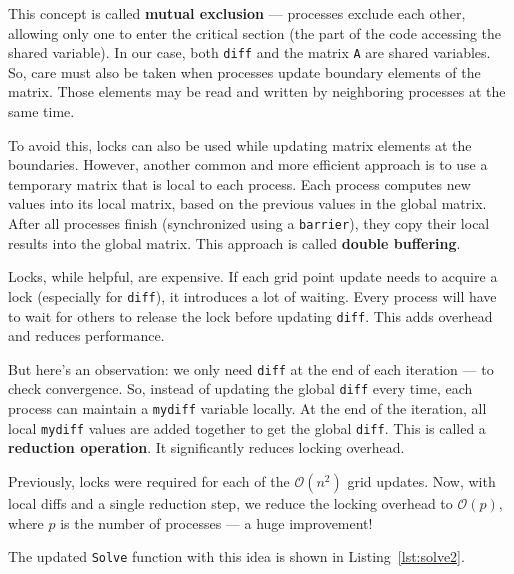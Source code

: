 \documentclass[12pt]{book}
\begin{document}
This concept is called \textbf{mutual exclusion} — processes exclude each other, allowing only one to enter the critical section (the part of the code accessing the shared variable). In our case, both \texttt{diff} and the matrix \texttt{A} are shared variables. So, care must also be taken when processes update boundary elements of the matrix. Those elements may be read and written by neighboring processes at the same time.

To avoid this, locks can also be used while updating matrix elements at the boundaries. However, another common and more efficient approach is to use a temporary matrix that is local to each process. Each process computes new values into its local matrix, based on the previous values in the global matrix. After all processes finish (synchronized using a \texttt{barrier}), they copy their local results into the global matrix. This approach is called \textbf{double buffering}.

Locks, while helpful, are expensive. If each grid point update needs to acquire a lock (especially for \texttt{diff}), it introduces a lot of waiting. Every process will have to wait for others to release the lock before updating \texttt{diff}. This adds overhead and reduces performance.

But here’s an observation: we only need \texttt{diff} at the end of each iteration — to check convergence. So, instead of updating the global \texttt{diff} every time, each process can maintain a \texttt{mydiff} variable locally. At the end of the iteration, all local \texttt{mydiff} values are added together to get the global \texttt{diff}. This is called a \textbf{reduction operation}. It significantly reduces locking overhead.

Previously, locks were required for each of the $\mathcal{O}(n^2)$ grid updates. Now, with local diffs and a single reduction step, we reduce the locking overhead to $\mathcal{O}(p)$, where $p$ is the number of processes — a huge improvement!

The updated \texttt{Solve} function with this idea is shown in Listing~\ref{lst:solve2}.
\end{document}

